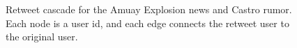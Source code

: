 %

\begin{figure}[t]
\centering
{}

\caption{Retweet cascade for the Amuay Explosion news and Castro rumor. Each node is a user id, and each edge connects the retweet user to the original user.}
\label{fig:full-cascade}
\end{figure}


